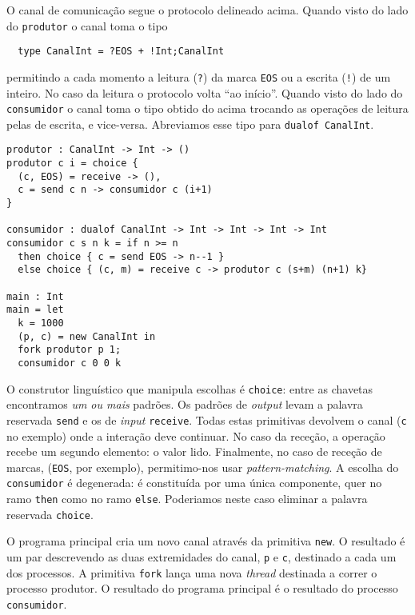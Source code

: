 O canal de comunicação segue o  protocolo delineado acima. Quando
visto do lado do \lstinline|produtor| o canal toma o tipo
%
\begin{lstlisting}
  type CanalInt = ?EOS + !Int;CanalInt
\end{lstlisting}
%
permitindo a cada momento a leitura (\lstinline|?|) da marca
\lstinline|EOS| ou a escrita (\lstinline|!|) de um inteiro. No caso da
leitura o protocolo volta ``ao início''.
%
Quando visto do lado do \lstinline|consumidor| o canal toma o tipo
obtido do acima trocando as operações de leitura pelas de escrita, e
vice-versa. Abreviamos esse tipo para \lstinline|dualof CanalInt|.

\begin{lstlisting}
produtor : CanalInt -> Int -> ()
produtor c i = choice {
  (c, EOS) = receive -> (),
  c = send c n -> consumidor c (i+1)
}

consumidor : dualof CanalInt -> Int -> Int -> Int -> Int
consumidor c s n k = if n >= n
  then choice { c = send EOS -> n--1 }
  else choice { (c, m) = receive c -> produtor c (s+m) (n+1) k}

main : Int
main = let
  k = 1000
  (p, c) = new CanalInt in
  fork produtor p 1;
  consumidor c 0 0 k
\end{lstlisting}

O construtor linguístico que manipula escolhas é \lstinline|choice|:
entre as chavetas encontramos \emph{um ou mais} padrões. Os padrões de
\textit{output} levam a palavra reservada \lstinline|send| e os de
\textit{input} \lstinline|receive|. Todas estas primitivas devolvem o
canal (\lstinline|c| no exemplo) onde a interação deve continuar. No
caso da receção, a operação recebe um segundo elemento: o valor
lido. Finalmente, no caso de receção de marcas, (\lstinline|EOS|, por
exemplo), permitimo-nos usar \textit{pattern-matching}.
%
A escolha do \lstinline|consumidor| é degenerada: é constituída por
uma única componente, quer no ramo \lstinline|then| como no ramo
\lstinline|else|. Poderiamos neste caso eliminar a palavra reservada
\lstinline|choice|.

O programa principal cria um novo canal através da primitiva
\lstinline|new|. O resultado é um par descrevendo as duas extremidades
do canal, \lstinline|p| e \lstinline|c|, destinado a cada um dos
processos.
%
A primitiva \lstinline|fork| lança uma nova \textit{thread} destinada
a correr o processo produtor. O resultado do programa principal é o
resultado do processo \lstinline|consumidor|.

